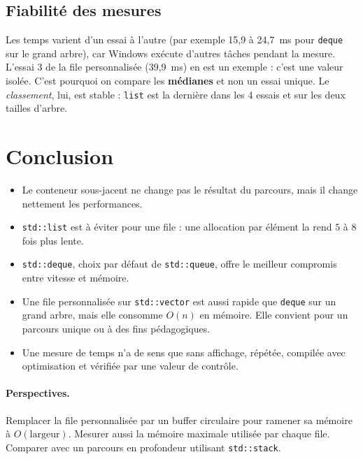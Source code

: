 \documentclass[11pt,a4paper]{article}
\begin{document}
\subsection{Fiabilité des mesures}

Les temps varient d'un essai à l'autre (par exemple 15,9 à 24,7~ms pour \texttt{deque} sur le
grand arbre), car Windows exécute d'autres tâches pendant la mesure. L'essai 3 de la file personnalisée
(39,9~ms) en est un exemple : c'est une valeur isolée. C'est pourquoi on compare les \textbf{médianes} et
non un essai unique. Le \emph{classement}, lui, est stable : \texttt{list} est la dernière dans
les 4 essais et sur les deux tailles d'arbre.

\section{Conclusion}

\begin{itemize}
  \item Le conteneur sous-jacent ne change pas le résultat du parcours, mais il change nettement
        les performances.
  \item \texttt{std::list} est à éviter pour une file : une allocation par élément la rend
        $5$ à $8$ fois plus lente.
  \item \texttt{std::deque}, choix par défaut de \texttt{std::queue}, offre le meilleur compromis
        entre vitesse et mémoire.
  \item Une file personnalisée sur \texttt{std::vector} est aussi rapide que \texttt{deque} sur un grand arbre,
        mais elle consomme $O(n)$ en mémoire. Elle convient pour un parcours unique ou à des fins
        pédagogiques.
  \item Une mesure de temps n'a de sens que sans affichage, répétée, compilée avec optimisation
        et vérifiée par une valeur de contrôle.
\end{itemize}

\paragraph{Perspectives.}
Remplacer la file personnalisée par un buffer circulaire pour ramener sa mémoire à $O(\text{largeur})$.
Mesurer aussi la mémoire maximale utilisée par chaque file. Comparer avec un parcours en
profondeur utilisant \texttt{std::stack}.
\end{document}
